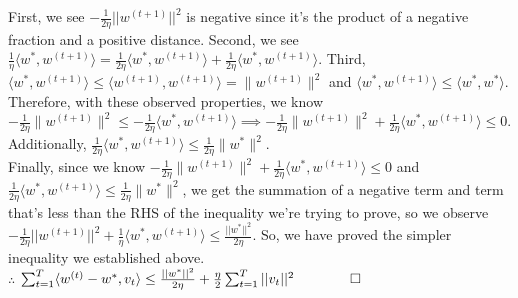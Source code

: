 \documentclass[11pt,english]{article}
\begin{document}
	First, we see $-\frac{1}{2\eta} ||w^{(t+1)}||^2$ is negative since it's the product of a negative fraction and a positive distance. Second, we see $\frac{1}{\eta}\langle w^*, w^{(t+1)}\rangle = \frac{1}{2\eta}\langle w^*, w^{(t+1)}\rangle + \frac{1}{2\eta}\langle w^*, w^{(t+1)}\rangle$. Third, $\langle w^*, w^{(t+1)}\rangle \leq \langle w^{(t+1)}, w^{(t+1)}\rangle = \|w^{(t+1)}\|^2$ and $\langle w^*, w^{(t+1)}\rangle \leq \langle w^{*}, w^{*}\rangle$. Therefore, with these observed properties, we know $-\frac{1}{2\eta}\| w^{(t+1)}\|^2 \leq - \frac{1}{2\eta}\langle w^*, w^{(t+1)}\rangle \implies -\frac{1}{2\eta}\| w^{(t+1)}\|^2 + \frac{1}{2\eta}\langle w^*, w^{(t+1)}\rangle \leq 0$. Additionally, $\frac{1}{2\eta}\langle w^*, w^{(t+1)}\rangle \leq \frac{1}{2\eta}\|w^*\|^2$. \\
	
	Finally, since we know $-\frac{1}{2\eta}\| w^{(t+1)}\|^2 + \frac{1}{2\eta}\langle w^*, w^{(t+1)}\rangle \leq 0$ and $\frac{1}{2\eta}\langle w^*, w^{(t+1)}\rangle \leq \frac{1}{2\eta}\|w^*\|^2$, we get the summation of a negative term and term that's less than the RHS of the inequality we're trying to prove, so we observe $-\frac{1}{2\eta} ||w^{(t+1)}||^2 +\frac{1}{\eta}\langle w^*, w^{(t+1)}\rangle \leq \frac{||w^*||^2}{2\eta}$. So, we have proved the simpler inequality we established above.\\
	
	$\therefore$ $\sum_{t=1}^{T}\langle w^{(t)} - w^*, v_t\rangle \leq \frac{||w^*||^2}{2\eta} + \frac{\eta}{2}\sum_{t=1}^{T}||v_t||^2 \qquad\qed$
	\pagebreak
	
\end{document}
